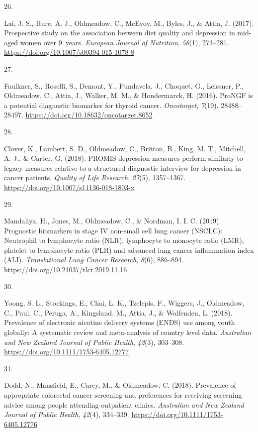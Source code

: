 \documentclass[11pt, a4paper]{awesome-cv}
\newlength{\csllabelwidth}
\newcommand{\CSLLeftMargin}[1]{\parbox[t]{\csllabelwidth}{#1}}
\newcommand{\CSLRightInline}[1]{\parbox[t]{\linewidth - \csllabelwidth}{#1}}
\begin{document}
\leavevmode\hypertarget{ref-lai_prospective_2017}{}%
\CSLLeftMargin{26. }
\CSLRightInline{Lai, J. S., Hure, A. J., Oldmeadow, C., McEvoy, M.,
Byles, J., \& Attia, J. (2017). Prospective study on the association
between diet quality and depression in mid-aged women over 9~years.
\emph{European Journal of Nutrition}, \emph{56}(1), 273--281.
\url{https://doi.org/10.1007/s00394-015-1078-8}}

\leavevmode\hypertarget{ref-faulkner_prongf_2016}{}%
\CSLLeftMargin{27. }
\CSLRightInline{Faulkner, S., Roselli, S., Demont, Y., Pundavela, J.,
Choquet, G., Leissner, P., Oldmeadow, C., Attia, J., Walker, M. M., \&
Hondermarck, H. (2016). ProNGF is a potential diagnostic biomarker for
thyroid cancer. \emph{Oncotarget}, \emph{7}(19), 28488--28497.
\url{https://doi.org/10.18632/oncotarget.8652}}

\leavevmode\hypertarget{ref-clover_promis_2018}{}%
\CSLLeftMargin{28. }
\CSLRightInline{Clover, K., Lambert, S. D., Oldmeadow, C., Britton, B.,
King, M. T., Mitchell, A. J., \& Carter, G. (2018). PROMIS depression
measures perform similarly to legacy measures relative to a structured
diagnostic interview for depression in cancer patients. \emph{Quality of
Life Research}, \emph{27}(5), 1357--1367.
\url{https://doi.org/10.1007/s11136-018-1803-x}}

\leavevmode\hypertarget{ref-mandaliya_prognostic_2019}{}%
\CSLLeftMargin{29. }
\CSLRightInline{Mandaliya, H., Jones, M., Oldmeadow, C., \& Nordman, I.
I. C. (2019). Prognostic biomarkers in stage IV non-small cell lung
cancer (NSCLC): Neutrophil to lymphocyte ratio (NLR), lymphocyte to
monocyte ratio (LMR), platelet to lymphocyte ratio (PLR) and advanced
lung cancer inflammation index (ALI). \emph{Translational Lung Cancer
Research}, \emph{8}(6), 886--894.
\url{https://doi.org/10.21037/tlcr.2019.11.16}}

\leavevmode\hypertarget{ref-yoong_prevalence_2018}{}%
\CSLLeftMargin{30. }
\CSLRightInline{Yoong, S. L., Stockings, E., Chai, L. K., Tzelepis, F.,
Wiggers, J., Oldmeadow, C., Paul, C., Peruga, A., Kingsland, M., Attia,
J., \& Wolfenden, L. (2018). Prevalence of electronic nicotine delivery
systems (ENDS) use among youth globally: A systematic review and
meta-analysis of country level data. \emph{Australian and New Zealand
Journal of Public Health}, \emph{42}(3), 303--308.
\url{https://doi.org/10.1111/1753-6405.12777}}

\leavevmode\hypertarget{ref-dodd_prevalence_2018}{}%
\CSLLeftMargin{31. }
\CSLRightInline{Dodd, N., Mansfield, E., Carey, M., \& Oldmeadow, C.
(2018). Prevalence of appropriate colorectal cancer screening and
preferences for receiving screening advice among people attending
outpatient clinics. \emph{Australian and New Zealand Journal of Public
Health}, \emph{42}(4), 334--339.
\url{https://doi.org/10.1111/1753-6405.12776}}
\end{document}
